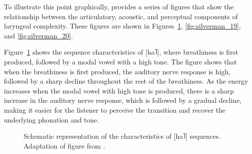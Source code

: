 To illustrate this point graphically, \citeauthor{silvermanLaryngealComplexityOtomanguean1997} provides a series of figures that show the relationship between the articulatory, acoustic, and perceptual components of laryngeal complexity. These figures are shown in Figures~\ref{fig:silverman_18}, \ref{fig:silverman_19}, and \ref{fig:silverman_20}. 

Figure~\ref{fig:silverman_18} shows the sequence characteristics of [ha˥], where breathiness is first produced, followed by a modal vowel with a high tone. The figure shows that when the breathiness is first produced, the auditory nerve response is high, followed by a sharp decline throughout the rest of the breathiness. As the energy increases when the modal vowel with high tone is produced, there is a sharp increase in the auditory nerve response, which is followed by a gradual decline, making it easier for the listener to perceive the transition and recover the underlying phonation and tone.
\begin{figure}[h!]
    \centering
    \caption{Schematic representation of the characteristics of [ha˥] sequences. Adaptation of figure from \citet{silvermanLaryngealComplexityOtomanguean1997}.}
    \label{fig:silverman_18}
\end{figure}

